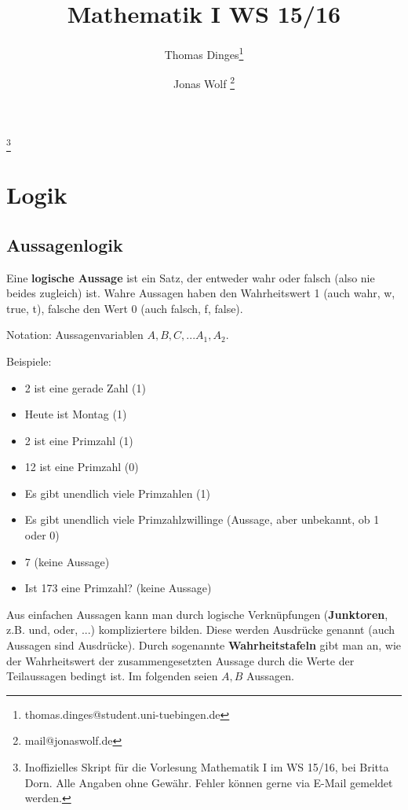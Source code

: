 \documentclass[a4paper, 12pt, twoside] {article}
\title{Mathematik I WS 15/16}
\author{Thomas Dinges\thanks{thomas.dinges@student.uni-tuebingen.de} \and Jonas Wolf \thanks{mail@jonaswolf.de}}
\begin{document}
\maketitle

\vfill
\thanks{Inoffizielles Skript für die Vorlesung Mathematik I im WS 15/16, bei Britta Dorn. Alle Angaben ohne Gewähr. Fehler können gerne via E-Mail gemeldet werden.}

\newpage

\tableofcontents

\newpage

\section{Logik}


\subsection*{Aussagenlogik}
Eine \textbf{logische Aussage} ist ein Satz, der entweder wahr oder falsch (also nie beides zugleich) ist. 
Wahre Aussagen haben den Wahrheitswert 1 (auch wahr, w, true, t), falsche den Wert 0 (auch falsch, f, false).

Notation: Aussagenvariablen $A, B, C, ... A_1, A_2$.

Beispiele:
\begin{itemize}
\item 2 ist eine gerade Zahl (1)
\item Heute ist Montag (1)
\item 2 ist eine Primzahl (1)
\item 12 ist eine Primzahl (0)
\item Es gibt unendlich viele Primzahlen (1)
\item Es gibt unendlich viele Primzahlzwillinge (Aussage, aber unbekannt, ob 1 oder 0)
\item 7 (keine Aussage)
\item Ist 173 eine Primzahl? (keine Aussage)
\end{itemize}


Aus einfachen Aussagen kann man durch logische Verknüpfungen (\textbf{Junktoren}, z.B. und, oder, ...) kompliziertere bilden. Diese werden Ausdrücke genannt (auch Aussagen sind Ausdrücke). 
Durch sogenannte \textbf{Wahrheitstafeln} gibt man an, wie der Wahrheitswert der zusammengesetzten Aussage durch die Werte der Teilaussagen bedingt ist. Im folgenden seien $A, B$ Aussagen. 
\end{document}
